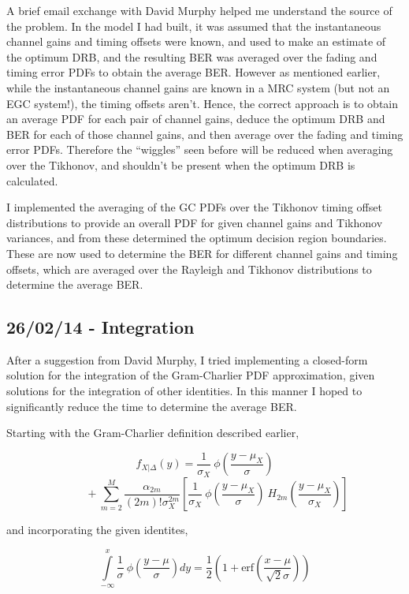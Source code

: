 A brief email exchange with David Murphy helped me understand the source of the
problem. In the model I had built, it was assumed that the instantaneous
channel gains and timing offsets were known, and used to make an
estimate of the optimum DRB, and the resulting BER was averaged over the
fading and timing error PDFs to obtain the average BER. However as
mentioned earlier, while the instantaneous channel gains are known in a
MRC system (but not an EGC system!), the timing offsets aren't. Hence,
the correct approach is to obtain an average PDF for each pair of
channel gains, deduce the optimum DRB and BER for each of those channel
gains, and then average over the fading and timing error PDFs. Therefore
the ``wiggles'' seen before will be reduced when averaging over the
Tikhonov, and shouldn't be present when the optimum DRB is calculated.

I implemented the averaging of the GC PDFs over the Tikhonov timing
offset distributions to provide an overall PDF for given channel gains
and Tikhonov variances, and from these determined the optimum decision
region boundaries. These are now used to determine the BER for different
channel gains and timing offsets, which are averaged over the Rayleigh
and Tikhonov distributions to determine the average BER.

\subsection{26/02/14 - Integration}

After a suggestion from David Murphy, I tried implementing a closed-form
solution for the integration of the Gram-Charlier PDF approximation,
given solutions for the integration of other identities. In this manner
I hoped to significantly reduce the time to determine the average BER.

Starting with the Gram-Charlier definition described earlier,

\[
f_{X\vert \Delta}(y) = \frac{1}{\sigma_X} \: \phi \! \left ( \frac{y-\mu_X}{\sigma} \right )
\]
\[
\; \; \; \; \; \; \; \; + \sum \limits_{m=2}^M \frac{\alpha_{2m}}{(2m)! \sigma_X^{2m}} \left [ \frac{1}{\sigma_X} \: \phi \! \left ( \frac{y-\mu_X}{\sigma} \right ) \: H_{2m} \! \left ( \frac{y-\mu_X}{\sigma_X} \right ) \right ]
\]

and incorporating the given identites,

\[
\int \limits_{-\infty}^x \frac{1}{\sigma} \: \phi \! \left ( \frac{y-\mu}{\sigma} \right ) dy =
\frac{1}{2} \left ( 1 + \text{erf} \! \left ( \frac{x-\mu}{\sqrt{2} \sigma} \right ) \right )
\]

